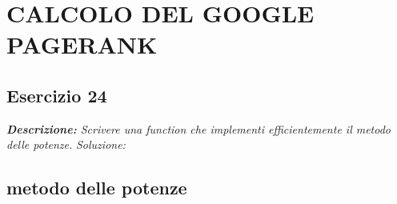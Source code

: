 \chapter{CALCOLO DEL GOOGLE PAGERANK}
\section{Esercizio 24}
\textit{\textbf{Descrizione:}  Scrivere una function che implementi efficientemente il metodo delle potenze.}\newline
\noindent\emph{Soluzione: }\newline
\section*{metodo delle potenze}
\newpage